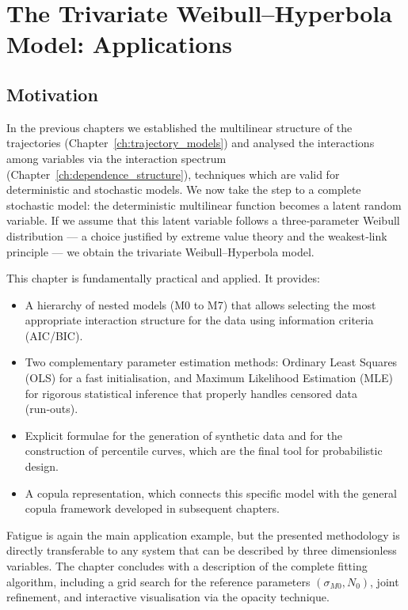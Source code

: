 \startcontents[chapter]
\chapter{The Trivariate Weibull–Hyperbola Model: Applications}
\label{ch:weibull-hyperbola}
\minitocboxed

\section*{Motivation}

In the previous chapters we established the multilinear structure of the trajectories (Chapter~\ref{ch:trajectory_models}) and analysed the interactions among variables via the interaction spectrum (Chapter~\ref{ch:dependence_structure}), techniques which are valid for deterministic and stochastic models. We now take the step to a complete stochastic model: the deterministic multilinear function becomes a latent random variable. If we assume that this latent variable follows a three‑parameter Weibull distribution — a choice justified by extreme value theory and the weakest‑link principle — we obtain the trivariate Weibull–Hyperbola model.

This chapter is fundamentally practical and applied. It provides:

\begin{itemize}
    \item A hierarchy of nested models (M0 to M7) that allows selecting the most appropriate interaction structure for the data using information criteria (AIC/BIC).
    \item Two complementary parameter estimation methods: Ordinary Least Squares (OLS) for a fast initialisation, and Maximum Likelihood Estimation (MLE) for rigorous statistical inference that properly handles censored data (run‑outs).
    \item Explicit formulae for the generation of synthetic data and for the construction of percentile curves, which are the final tool for probabilistic design.
    \item A copula representation, which connects this specific model with the general copula framework developed in subsequent chapters.
\end{itemize}

Fatigue is again the main application example, but the presented methodology is directly transferable to any system that can be described by three dimensionless variables. The chapter concludes with a description of the complete fitting algorithm, including a grid search for the reference parameters \((\sigma_{M0}, N_0)\), joint refinement, and interactive visualisation via the opacity technique.


